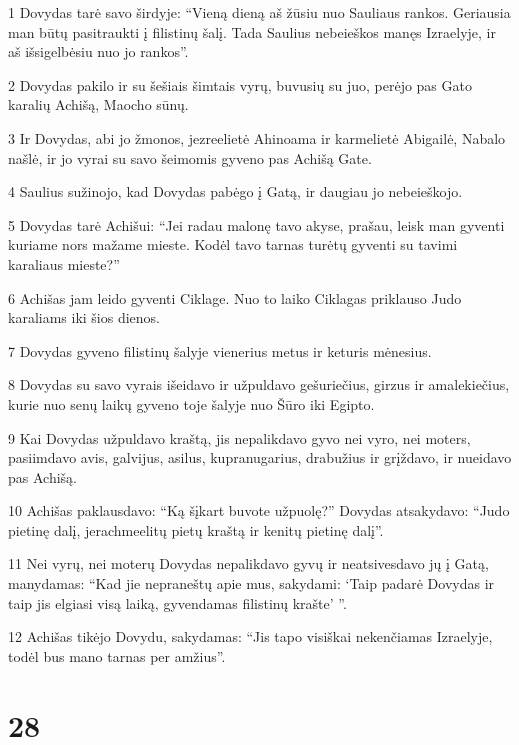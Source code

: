 \par 1 Dovydas tarė savo širdyje: “Vieną dieną aš žūsiu nuo Sauliaus rankos. Geriausia man būtų pasitraukti į filistinų šalį. Tada Saulius nebeieškos manęs Izraelyje, ir aš išsigelbėsiu nuo jo rankos”. 
\par 2 Dovydas pakilo ir su šešiais šimtais vyrų, buvusių su juo, perėjo pas Gato karalių Achišą, Maocho sūnų. 
\par 3 Ir Dovydas, abi jo žmonos, jezreelietė Ahinoama ir karmelietė Abigailė, Nabalo našlė, ir jo vyrai su savo šeimomis gyveno pas Achišą Gate. 
\par 4 Saulius sužinojo, kad Dovydas pabėgo į Gatą, ir daugiau jo nebeieškojo. 
\par 5 Dovydas tarė Achišui: “Jei radau malonę tavo akyse, prašau, leisk man gyventi kuriame nors mažame mieste. Kodėl tavo tarnas turėtų gyventi su tavimi karaliaus mieste?” 
\par 6 Achišas jam leido gyventi Ciklage. Nuo to laiko Ciklagas priklauso Judo karaliams iki šios dienos. 
\par 7 Dovydas gyveno filistinų šalyje vienerius metus ir keturis mėnesius. 
\par 8 Dovydas su savo vyrais išeidavo ir užpuldavo gešuriečius, girzus ir amalekiečius, kurie nuo senų laikų gyveno toje šalyje nuo Šūro iki Egipto. 
\par 9 Kai Dovydas užpuldavo kraštą, jis nepalikdavo gyvo nei vyro, nei moters, pasiimdavo avis, galvijus, asilus, kupranugarius, drabužius ir grįždavo, ir nueidavo pas Achišą. 
\par 10 Achišas paklausdavo: “Ką šįkart buvote užpuolę?” Dovydas atsakydavo: “Judo pietinę dalį, jerachmeelitų pietų kraštą ir kenitų pietinę dalį”. 
\par 11 Nei vyrų, nei moterų Dovydas nepalikdavo gyvų ir neatsivesdavo jų į Gatą, manydamas: “Kad jie nepraneštų apie mus, sakydami: ‘Taip padarė Dovydas ir taip jis elgiasi visą laiką, gyvendamas filistinų krašte’ ”. 
\par 12 Achišas tikėjo Dovydu, sakydamas: “Jis tapo visiškai nekenčiamas Izraelyje, todėl bus mano tarnas per amžius”.



\chapter{28}

